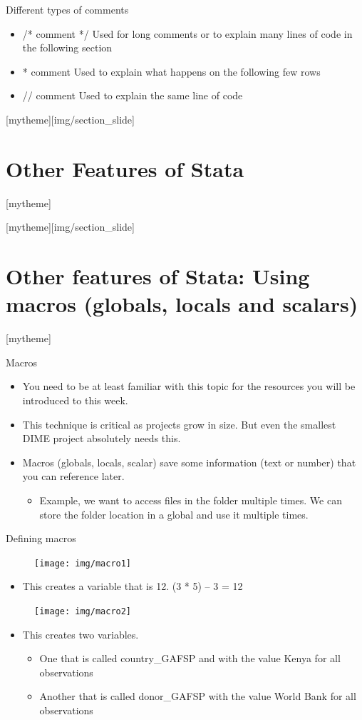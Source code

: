 \documentclass[aspectratio=169]{beamer}
\newcommand{\sectionpic}[2]{
	\setbeamertemplate{section page}[mytheme][#2]
	\section{#1}
	\setbeamertemplate{section page}[mytheme]
}
\begin{document}
\begin{frame}{Different types of comments}
\begin{itemize}
	\item /* comment */ Used for long comments or to explain many lines of code in the following section
	\item * comment Used to explain what happens on the following few rows
	\item // comment Used to explain the same line of code
\end{itemize}
\end{frame}

\sectionpic{Other Features of Stata}{img/section_slide}

\sectionpic{Other features of Stata: \newline Using macros (globals, locals and scalars)}{img/section_slide}

\begin{frame}{Macros}
\begin{itemize}
	\item You need to be at least familiar with this topic for the resources you will be introduced to this week.
	\item This technique is critical as projects grow in size. But even the smallest DIME project absolutely needs this.
	\item Macros (globals, locals, scalar) save some information (text or number) that you can reference later.
		\begin{itemize}
			\item Example, we want to access files in the folder multiple times. We can store the folder location in a global and use it multiple times.
		\end{itemize}
\end{itemize}
\end{frame}

\begin{frame}{Defining macros}
\begin{figure}
	\centering
	\texttt{[image: img/macro1]}
\end{figure}
\begin{itemize}
	\item This creates a variable that is 12. (3 * 5) – 3 = 12
\end{itemize}

\begin{figure}
	\centering
	\texttt{[image: img/macro2]}
\end{figure}
\begin{itemize}
	\item This creates two variables. 
		\begin{itemize}
			\item One that is called country\_GAFSP and with the value Kenya for all observations
			\item Another that is called donor\_GAFSP with the value World Bank for all observations
	\end{itemize}
\end{itemize}
\end{frame}
\end{document}
